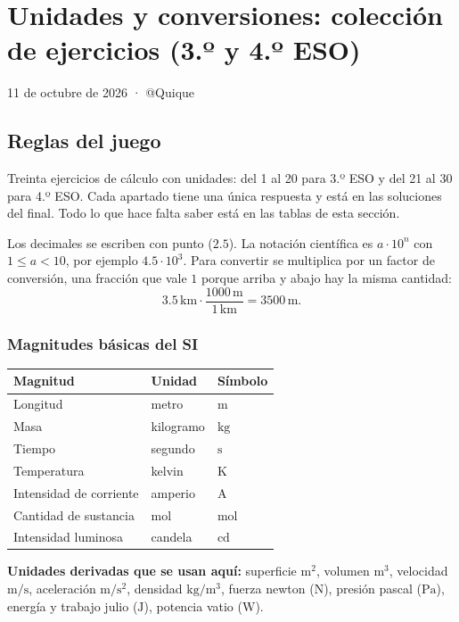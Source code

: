 \section{Unidades y conversiones: colección de ejercicios (3.º y 4.º ESO)}

11 de octubre de 2026 · @Quique

\subsection{Reglas del juego}

Treinta ejercicios de cálculo con unidades: del 1 al 20 para 3.º ESO y del 21 al 30 para 4.º ESO. Cada apartado tiene una única respuesta y está en las soluciones del final. Todo lo que hace falta saber está en las tablas de esta sección.

Los decimales se escriben con punto ($2.5$). La notación científica es $a\cdot10^n$ con $1\leq a<10$, por ejemplo $4.5\cdot10^3$. Para convertir se multiplica por un factor de conversión, una fracción que vale $1$ porque arriba y abajo hay la misma cantidad:
\[
3.5\,\mathrm{km}\cdot
\frac{1000\,\mathrm{m}}{1\,\mathrm{km}}
=3500\,\mathrm{m}.
\]

\subsubsection*{Magnitudes básicas del SI}

\begin{center}
\begin{tabular}{lll}
\hline
Magnitud & Unidad & Símbolo \\
\hline
Longitud & metro & $\mathrm{m}$ \\
Masa & kilogramo & $\mathrm{kg}$ \\
Tiempo & segundo & $\mathrm{s}$ \\
Temperatura & kelvin & $\mathrm{K}$ \\
Intensidad de corriente & amperio & $\mathrm{A}$ \\
Cantidad de sustancia & mol & $\mathrm{mol}$ \\
Intensidad luminosa & candela & $\mathrm{cd}$ \\
\hline
\end{tabular}
\end{center}

\textbf{Unidades derivadas que se usan aquí:}
superficie $\mathrm{m^2}$, volumen $\mathrm{m^3}$,
velocidad $\mathrm{m/s}$, aceleración $\mathrm{m/s^2}$,
densidad $\mathrm{kg/m^3}$, fuerza newton ($\mathrm{N}$),
presión pascal ($\mathrm{Pa}$), energía y trabajo julio ($\mathrm{J}$),
potencia vatio ($\mathrm{W}$).

